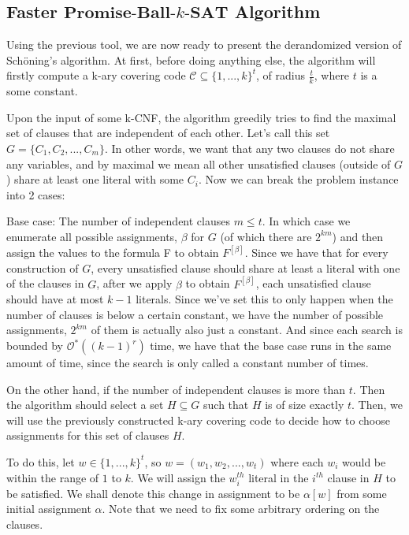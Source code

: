 \documentclass[a4paper,12pts]{article}
\newcommand{\SATbf}{\textbf{$k$-SAT}}
\newcommand{\PBSbf}{\textbf{Promise-Ball-$\SATbf$}}
\newcommand{\kbits}{\{1,...,k\}}
\renewcommand{\O}{\mathcal{O}^*}
\begin{document}
\subsection{Faster $\PBSbf$ Algorithm}
Using the previous tool, we are now ready to present the derandomized version of Sch\"{o}ning's algorithm. At first, before doing anything else, the algorithm will firstly compute a k-ary covering code $\mathcal{C} \subseteq \kbits^{t}$, of radius $\frac{t}{k}$, where $t$ is a some constant.\par

Upon the input of some k-CNF, the algorithm greedily tries to find the maximal set of clauses that are independent of each other. Let's call this set $G = \{C_1, C_2, ...,C_m\}$. In other words, we want that any two clauses do not share any variables, and by maximal we mean all other unsatisfied clauses (outside of $G$) share at least one literal with some $C_i$. Now we can break the problem instance into 2 cases: \par

Base case: The number of independent clauses $m \leq t$. In which case we enumerate all possible assignments, $\beta$ for $G$ (of which there are $2^{km}$) and then assign the values to the formula F to obtain $F^{[\beta]}$. Since we have that for every construction of $G$, every unsatisfied clause should share at least a literal with one of the clauses in $G$, after we apply $\beta$ to obtain $F^{[\beta]}$, each unsatisfied clause should have at most $k-1$ literals. Since we've set this to only happen when the number of clauses is below a certain constant, we have the number of possible assignments, $2^{km}$ of them is actually also just a constant. And since each search is bounded by $\O((k-1)^r)$ time, we have that the base case runs in the same amount of time, since the search is only called a constant number of times.\par

On the other hand, if the number of independent clauses is more than $t$. Then the algorithm should select a set $H \subseteq G$ such that $H$ is of size exactly $t$. Then, we will use the previously constructed k-ary covering code to decide how to choose assignments for this set of clauses $H$.\par

To do this, let $w \in \kbits^{t}$, so $w = (w_1, w_2, ..., w_t)$ where each $w_i$ would be within the range of $1$ to $k$. We will assign the $w_i^{th}$ literal in the $i^{th}$ clause in $H$ to be satisfied. We shall denote this change in assignment to be $\alpha[w]$ from some initial assignment $\alpha$. Note that we need to fix some arbitrary ordering on the clauses. \par
\end{document}
